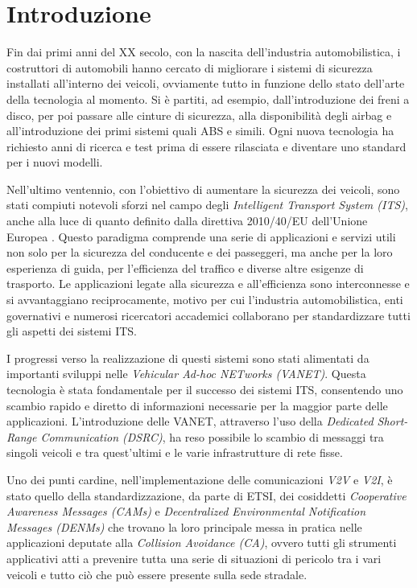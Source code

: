 \chapter{Introduzione}

Fin dai primi anni del XX secolo, con la nascita dell'industria automobilistica, i costruttori di automobili hanno cercato di migliorare i sistemi di sicurezza installati all'interno dei veicoli, ovviamente tutto in funzione dello stato dell'arte della tecnologia al momento. Si è partiti, ad esempio, dall'introduzione dei freni a disco, per poi passare alle cinture di sicurezza, alla disponibilità degli airbag e all'introduzione dei primi sistemi quali ABS e simili. Ogni nuova tecnologia ha richiesto anni di ricerca e test prima di essere rilasciata e diventare uno standard per i nuovi modelli.

Nell'ultimo ventennio, con l'obiettivo di aumentare la sicurezza dei veicoli, sono stati compiuti notevoli sforzi nel campo degli \textit{Intelligent Transport System (ITS)}, anche alla luce di quanto definito dalla direttiva 2010/40/EU dell'Unione Europea \cite{2010-40}. Questo paradigma comprende una serie di applicazioni e servizi utili non solo per la sicurezza del conducente e dei passeggeri, ma anche per la loro esperienza di guida, per l'efficienza del traffico e diverse altre esigenze di trasporto. Le applicazioni legate alla sicurezza e all'efficienza sono interconnesse e si avvantaggiano reciprocamente, motivo per cui l'industria automobilistica, enti governativi e numerosi ricercatori accademici collaborano per standardizzare tutti gli aspetti dei sistemi ITS.

I progressi verso la realizzazione di questi sistemi sono stati alimentati da importanti sviluppi nelle \textit{Vehicular Ad-hoc NETworks (VANET)}. Questa tecnologia è stata fondamentale per il successo dei sistemi ITS, consentendo uno scambio rapido e diretto di informazioni necessarie per la maggior parte delle applicazioni. L'introduzione delle VANET, attraverso l'uso della \textit{Dedicated Short-Range Communication (DSRC)}, ha reso possibile lo scambio di messaggi tra singoli veicoli e tra quest'ultimi e le varie infrastrutture di rete fisse.

Uno dei punti cardine, nell'implementazione delle comunicazioni \textit{V2V} e \textit{V2I}, è stato quello della standardizzazione, da parte di ETSI, dei cosiddetti \textit{Cooperative Awareness Messages (CAMs)} e \textit{Decentralized Environmental Notification Messages (DENMs)} che trovano la loro principale messa in pratica nelle applicazioni deputate alla \textit{Collision Avoidance (CA)}, ovvero tutti gli strumenti applicativi atti a prevenire tutta una serie di situazioni di pericolo tra i vari veicoli e tutto ciò che può essere presente sulla sede stradale.

